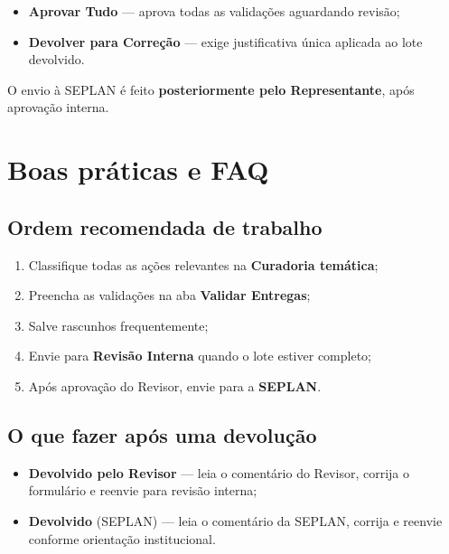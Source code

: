 \documentclass[11pt,a4paper]{article}
\begin{document}
\begin{itemize}
  \item \textbf{Aprovar Tudo} — aprova todas as validações aguardando revisão;
  \item \textbf{Devolver para Correção} — exige justificativa única aplicada ao lote devolvido.
\end{itemize}

\begin{boxatencao}
O envio à SEPLAN é feito \textbf{posteriormente pelo Representante}, após aprovação interna.
\end{boxatencao}

\section{Boas práticas e FAQ}

\subsection{Ordem recomendada de trabalho}

\begin{enumerate}
  \item Classifique todas as ações relevantes na \textbf{Curadoria temática};
  \item Preencha as validações na aba \textbf{Validar Entregas};
  \item Salve rascunhos frequentemente;
  \item Envie para \textbf{Revisão Interna} quando o lote estiver completo;
  \item Após aprovação do Revisor, envie para a \textbf{SEPLAN}.
\end{enumerate}

\subsection{O que fazer após uma devolução}

\begin{itemize}
  \item \textbf{Devolvido pelo Revisor} — leia o comentário do Revisor, corrija o formulário e reenvie para revisão interna;
  \item \textbf{Devolvido} (SEPLAN) — leia o comentário da SEPLAN, corrija e reenvie conforme orientação institucional.
\end{itemize}
\end{document}
